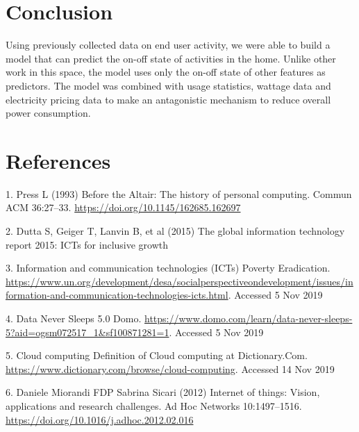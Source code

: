 \documentclass[11pt,]{article}
\begin{document}
\hypertarget{conclusion}{%
\section{Conclusion}\label{conclusion}}

Using previously collected data on end user activity, we were able to
build a model that can predict the on-off state of activities in the
home. Unlike other work in this space, the model uses only the on-off
state of other features as predictors. The model was combined with usage
statistics, wattage data and electricity pricing data to make an
antagonistic mechanism to reduce overall power consumption.

\hypertarget{references}{%
\section*{References}\label{references}}

\hypertarget{refs}{}
\leavevmode\hypertarget{ref-pressAltairHistoryPersonal1993}{}%
1. Press L (1993) Before the Altair: The history of personal computing.
Commun ACM 36:27--33. \url{https://doi.org/10.1145/162685.162697}

\leavevmode\hypertarget{ref-duttaGlobalInformationTechnology2015}{}%
2. Dutta S, Geiger T, Lanvin B, et al (2015) The global information
technology report 2015: ICTs for inclusive growth

\leavevmode\hypertarget{ref-InformationCommunicationTechnologies}{}%
3. Information and communication technologies (ICTs) \textbar{} Poverty
Eradication.
\url{https://www.un.org/development/desa/socialperspectiveondevelopment/issues/information-and-communication-technologies-icts.html}.
Accessed 5 Nov 2019

\leavevmode\hypertarget{ref-DataNeverSleeps}{}%
4. Data Never Sleeps 5.0 \textbar{} Domo.
\url{https://www.domo.com/learn/data-never-sleeps-5?aid=ogsm072517_1\&sf100871281=1}.
Accessed 5 Nov 2019

\leavevmode\hypertarget{ref-CloudComputingDefinition}{}%
5. Cloud computing \textbar{} Definition of Cloud computing at
Dictionary.Com. \url{https://www.dictionary.com/browse/cloud-computing}.
Accessed 14 Nov 2019

\leavevmode\hypertarget{ref-danielemiorandiInternetThingsVision2012}{}%
6. Daniele Miorandi FDP Sabrina Sicari (2012) Internet of things:
Vision, applications and research challenges. Ad Hoc Networks
10:1497--1516. \url{https://doi.org/10.1016/j.adhoc.2012.02.016}
\end{document}
